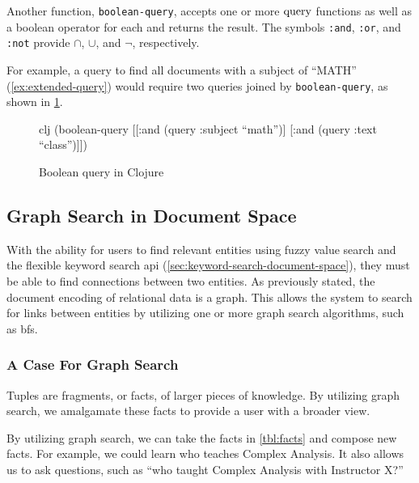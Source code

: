 			Another function, \texttt{boolean-query}, accepts one or more \(\operatorname{query}\) functions as well as a boolean operator for each and returns the result.  The symbols \texttt{:and}, \texttt{:or}, and \texttt{:not} provide \(\cap\), \(\cup\), and \(\neg\), respectively.
			
			\begin{ex}
				For example, a query to find all documents with a subject of ``MATH'' (\cref{ex:extended-query}) would require two queries joined by \texttt{boolean-query}, as shown in \cref{clj:boolean-query}.
				
				\begin{figure}
					\begin{singlespaced}
						\begin{pygments}{clj}
(boolean-query
 [[:and (query :subject ``math'')]
  [:and (query :text ``class'')]])
						\end{pygments}
					\end{singlespaced}
					
					\caption{Boolean query in Clojure}
					\label{clj:boolean-query}
				\end{figure}
			\end{ex}

	\subsection{Graph Search in Document Space}
		With the ability for users to find relevant entities using fuzzy value search and the flexible keyword search \gls{api} (\cref{sec:keyword-search-document-space}), they must be able to find connections between two entities.  As previously stated, the document encoding of relational data is a graph.  This allows the system to search for links between entities by utilizing one or more graph search algorithms, such as \gls{bfs}.
		
		\subsubsection{A Case For Graph Search}
			Tuples are fragments, or facts, of larger pieces of knowledge.  By utilizing graph search, we amalgamate these facts to provide a user with a broader view.
			
				By utilizing graph search, we can take the facts in \cref{tbl:facts} and compose new facts.  For example, we could learn who teaches Complex Analysis.  It also allows us to ask questions, such as ``who taught Complex Analysis with Instructor X?''
			
